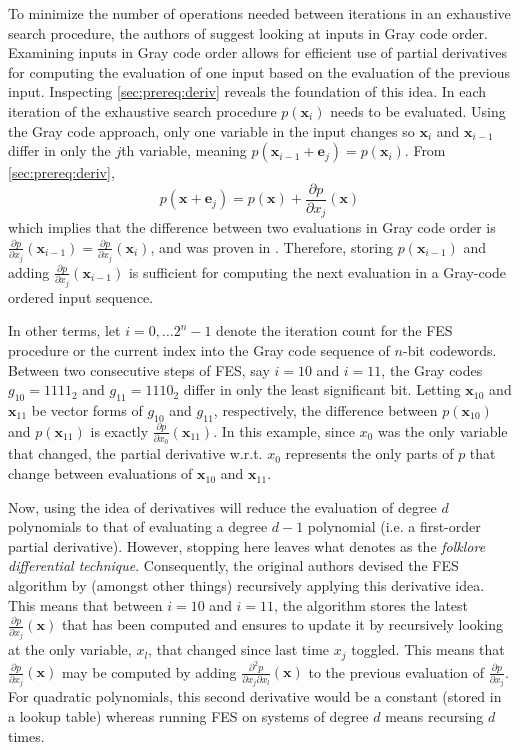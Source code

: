 To minimize the number of operations needed between iterations in an exhaustive search procedure, the authors of \cite{ches-2010-23990} suggest looking at inputs in Gray code order.
Examining inputs in Gray code order allows for efficient use of partial derivatives for computing the evaluation of one input based on the evaluation of the previous input. Inspecting \cref{sec:prereq:deriv} reveals the foundation of this idea. In each iteration of the exhaustive search procedure $p(\mathbf{x}_i)$ needs to be evaluated. Using the Gray code approach, only one variable in the input changes so $\mathbf{x}_i$ and $\mathbf{x}_{i - 1}$ differ in only the $j$th variable, meaning $p(\mathbf{x}_{i - 1} + \mathbf{e}_j) = p(\mathbf{x}_i)$. From \cref{sec:prereq:deriv}, $$
    p(\mathbf{x} + \mathbf{e}_j) = p(\mathbf{x}) + \frac{\partial p}{\partial x_j}(\mathbf{x})
$$ 
which implies that the difference between two evaluations in Gray code order is $\frac{\partial p}{\partial x_j}(\mathbf{x}_{i - 1}) = \frac{\partial p}{\partial x_j}(\mathbf{x}_i)$, and was proven in \cite{tungchoumasters}. Therefore, storing $p(\mathbf{x}_{i - 1})$ and adding $\frac{\partial p}{\partial x_j}(\mathbf{x}_{i-1})$ is sufficient for computing the next evaluation in a Gray-code ordered input sequence.

In other terms, let $i = 0,\dots 2^n-1$ denote the iteration count for the FES procedure or the current index into the Gray code sequence of $n$-bit codewords. Between two consecutive steps of FES, say $i = 10$ and $i = 11$, the Gray codes $g_{10} = 1111_2$ and $g_{11} = 1110_2$ differ in only the least significant bit. Letting $\mathbf{x}_{10}$ and $\mathbf{x}_{11}$ be vector forms of $g_{10}$ and $g_{11}$, respectively, the difference between $p(\mathbf{x}_{10})$ and $p(\mathbf{x}_{11})$ is exactly $\frac{\partial p}{\partial x_0}(\mathbf{x}_{11})$. In this example, since $x_0$ was the only variable that changed, the partial derivative w.r.t. $x_0$ represents the only parts of $p$ that change between evaluations of $\mathbf{x}_{10}$ and $\mathbf{x}_{11}$.

Now, using the idea of derivatives will reduce the evaluation of degree $d$ polynomials to that of evaluating a degree $d-1$ polynomial (i.e. a first-order partial derivative). However, stopping here leaves what \cite{ches-2010-23990} denotes as the \textit{folklore differential technique}. Consequently, the original authors devised the FES algorithm by (amongst other things) recursively applying this derivative idea. This means that between $i = 10$ and $i = 11$, the algorithm stores the latest $\frac{\partial p}{\partial x_j}(\mathbf{x})$ that has been computed and ensures to update it by recursively looking at the only variable, $x_l$, that changed since last time $x_j$ toggled. This means that $\frac{\partial p}{\partial x_j}(\mathbf{x})$ may be computed by adding $\frac{\partial^2 p}{\partial x_j \partial x_l}(\mathbf{x})$ to the previous evaluation of $\frac{\partial p}{\partial x_j}$. For quadratic polynomials, this second derivative would be a constant (stored in a lookup table) whereas running FES on systems of degree $d$ means recursing $d$ times. 

